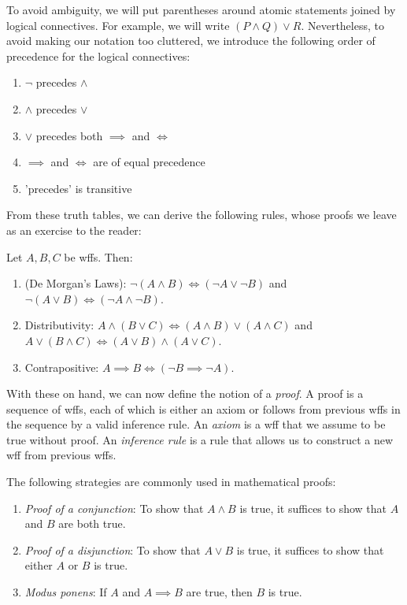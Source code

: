To avoid ambiguity, we will put parentheses around atomic statements joined by logical connectives. For example, we will write \((P \wedge Q) \vee R\). Nevertheless, to avoid making our notation too cluttered, we introduce the following order of precedence for the logical connectives:
\begin{enumerate}[label=(\arabic*)]
    \item \(\neg\) precedes \(\wedge\)
    \item \(\wedge\) precedes \(\vee\)
    \item \(\vee\) precedes both \(\implies\) and \(\iff\)
    \item \(\implies\) and \(\iff\) are of equal precedence
    \item 'precedes' is transitive
\end{enumerate}

From these truth tables, we can derive the following rules, whose proofs we leave as an exercise to the reader:

\begin{proposition}
    Let \(A, B, C\) be wffs. Then:
    \begin{enumerate}[label=(\alph*)]
        \item (De Morgan's Laws): \(\neg (A \wedge B) \iff (\neg A \vee \neg B)\) and \(\neg (A \vee B) \iff (\neg A \wedge \neg B)\).
        \item Distributivity: \(A \wedge (B \vee C) \iff (A \wedge B) \vee (A \wedge C)\) and \(A \vee (B \wedge C) \iff (A \vee B) \wedge (A \vee C)\).
        \item Contrapositive: \(A \implies B \iff (\neg B \implies \neg A)\).
    \end{enumerate} 
\end{proposition}

With these on hand, we can now define the notion of a \emph{proof}. A proof is a sequence of wffs, each of which is either an axiom or follows from previous wffs in the sequence by a valid inference rule. An \emph{axiom} is a wff that we assume to be true without proof. An \emph{inference rule} is a rule that allows us to construct a new wff from previous wffs.

The following strategies are commonly used in mathematical proofs:

\begin{enumerate}
    \item \emph{Proof of a conjunction}: To show that \(A \wedge B\) is true, it suffices to show that \(A\) and \(B\) are both true.
    \item \emph{Proof of a disjunction}: To show that \(A \vee B\) is true, it suffices to show that either \(A\) or \(B\) is true.
    \item \emph{Modus ponens}: If \(A\) and \(A \implies B\) are true, then \(B\) is true.
\end{enumerate}



